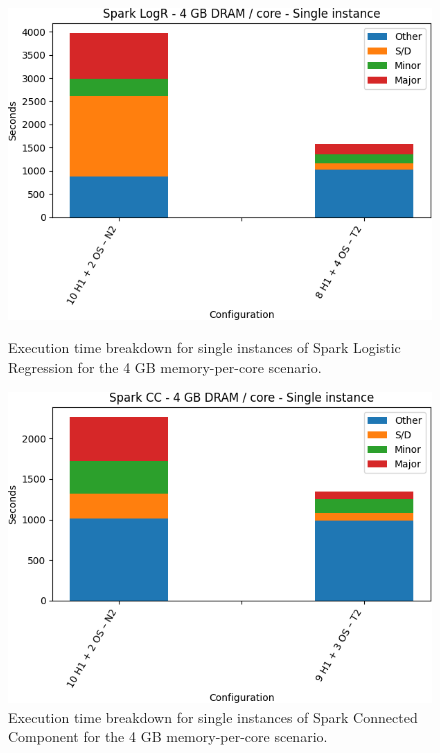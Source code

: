 \begin{figure}[thbp]
        \centering
    \includegraphics[width=\linewidth]{./fig/logr32_single.png}
    \caption{Execution time breakdown for single instances of Spark
    Logistic Regression for the 4 GB memory-per-core scenario.}
    \label{fig:logr32_single}

    \includegraphics[width=\linewidth]{./fig/cc32_single.png}
    \caption{Execution time breakdown for single instances of Spark
	Connected Component for the 4 GB memory-per-core scenario.}
    \label{fig:cc32_single}
\end{figure}


